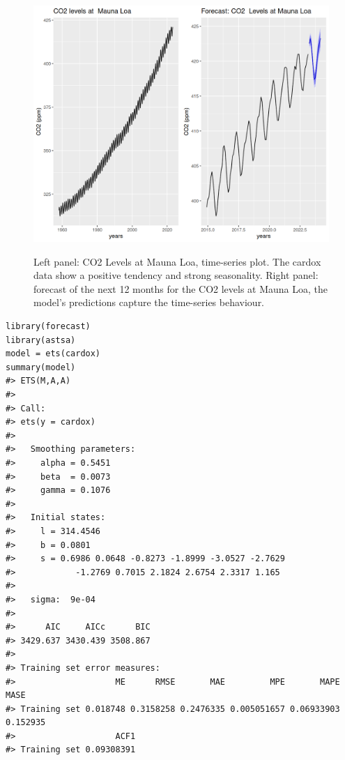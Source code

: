 \begin{figure}

{\centering \includegraphics[width=0.75\linewidth,alt={Left panel: CO2 Levels at Mauna Loa, time-series plot. The cardox data show a positive tendency and strong seasonality. Right panel: forecast of the next 12 months for the CO2 levels at Mauna Loa, the model's predictions capture the time-series behaviour.}]{figures/fig1-static-1} 

}

\caption{Left panel: CO2 Levels at Mauna Loa, time-series plot. The cardox data show a positive tendency and strong seasonality. Right panel: forecast of the next 12 months for the CO2 levels at Mauna Loa, the model's predictions capture the time-series behaviour.}\label{fig:fig1-static}
\end{figure}



\begin{verbatim}
library(forecast)
library(astsa)
model = ets(cardox)
summary(model)
#> ETS(M,A,A) 
#> 
#> Call:
#> ets(y = cardox)
#> 
#>   Smoothing parameters:
#>     alpha = 0.5451 
#>     beta  = 0.0073 
#>     gamma = 0.1076 
#> 
#>   Initial states:
#>     l = 314.4546 
#>     b = 0.0801 
#>     s = 0.6986 0.0648 -0.8273 -1.8999 -3.0527 -2.7629
#>            -1.2769 0.7015 2.1824 2.6754 2.3317 1.165
#> 
#>   sigma:  9e-04
#> 
#>      AIC     AICc      BIC 
#> 3429.637 3430.439 3508.867 
#> 
#> Training set error measures:
#>                    ME      RMSE       MAE         MPE       MAPE     MASE
#> Training set 0.018748 0.3158258 0.2476335 0.005051657 0.06933903 0.152935
#>                    ACF1
#> Training set 0.09308391
\end{verbatim}

